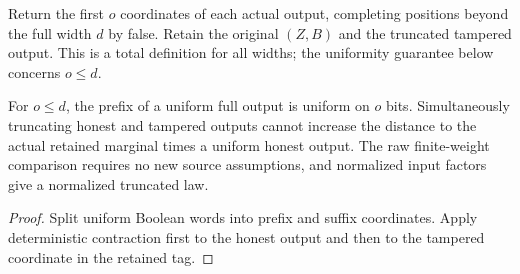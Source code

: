 \begin{definition}
  \label{def:lowerbounds-algebraic-advice-truncation}
  \leanok
  Return the first $o$ coordinates of each actual output, completing
  positions beyond the full width $d$ by false. Retain the original
  $(Z,B)$ and the truncated tampered output. This is a total definition
  for all widths; the uniformity guarantee below concerns $o\le d$.
\end{definition}

\begin{theorem}
  \label{thm:lowerbounds-algebraic-advice-truncation}
  \leanok
  For $o\le d$, the prefix of a uniform full output is uniform on $o$
  bits. Simultaneously truncating honest and tampered outputs cannot
  increase the distance to the actual retained marginal times a uniform
  honest output. The raw finite-weight comparison requires no new source
  assumptions, and normalized input factors give a normalized truncated law.
\end{theorem}
\begin{proof}
  \leanok
  Split uniform Boolean words into prefix and suffix coordinates. Apply
  deterministic contraction first to the honest output and then to the
  tampered coordinate in the retained tag.
\end{proof}

